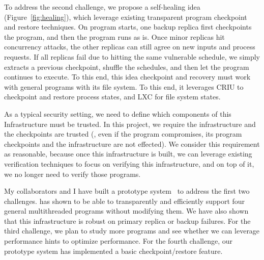 
To address the second challenge, we propose a self-healing idea 
(Figure~\ref{fig:healing}), which leverage existing transparent program 
checkpoint and restore techniques. On program starts, one backup replica first 
checkpoints the program, and then the program runs as is. Once minor replicas 
hit concurrency attacks, the other replicas can still agree on new inputs and 
process requests. If all replicas fail due to hitting the same vulnerable 
schedule, we simply extracts a previous checkpoint, shuffle the schedules, and 
then let the program continues to execute. To this end, this idea checkpoint 
and recovery must work with general programs with its file system. To this end, 
it leverages CRIU to checkpoint and restore process states, and LXC for file 
system states.

As a typical security setting, we need to define which components of 
this Infrastructure must be trusted. In this project, we require the 
infrastructure and the checkpoints are trusted (\ie, even if the program 
compromises, its program checkpoints and the infrastructure are not effected). 
We consider this requirement as reasonable, because once this infrastructure is 
built, we can leverage existing verification techniques to focus on verifying 
this infrastructure, and on top of it, we no longer need to verify those 
programs.






 My collaborators and I have built a prototype 
system~\cite{crane:sosp15} to address the first two challenges. \crane has 
shown to be able to transparently and efficiently support four general 
multithreaded programs without modifying them. We have also shown that this 
infrastructure is robust on primary replica or backup failures. For the third 
challenge, we plan to study more programs and see whether we can leverage 
performance hints to optimize performance. For the fourth challenge, our 
prototype system \crane has implemented a basic checkpoint/restore feature.

